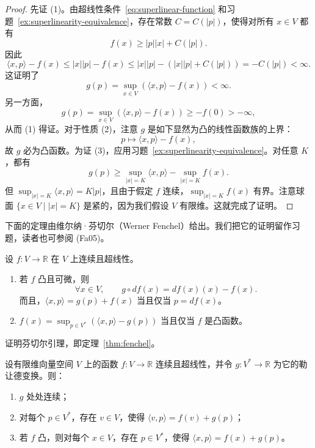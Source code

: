 \begin{proof}
先证 (1)。由超线性条件~\eqref{eq:superlinear-function} 和习题~\ref{ex:superlinearity-equivalence}，存在常数 $C=C(|p|)$，使得对所有 $x\in V$ 都有
\[
  f(x)\geq |p||x|+C(|p|).
\]
因此
\[
  \langle x,p\rangle-f(x)
  \leq |x||p|-f(x)
  \leq |x||p|-(|x||p|+C(|p|))
  =-C(|p|)<\infty.
\]
这证明了
\[
  g(p)=\sup_{x\in V}(\langle x,p\rangle-f(x))<\infty.
\]
另一方面，
\[
  g(p)=\sup_{x\in V}(\langle x,p\rangle-f(x))\geq-f(0)>-\infty,
\]
从而 (1) 得证。对于性质 (2)，注意 $g$ 是如下显然为凸的线性函数族的上界：
\[
  p\longmapsto\langle x,p\rangle-f(x),
\]
故 $g$ 必为凸函数。为证 (3)，应用习题~\ref{ex:superlinearity-equivalence}。对任意 $K$，都有
\[
  g(p)\geq\sup_{|x|=K}\langle x,p\rangle-\sup_{|x|=K}f(x).
\]
但 $\sup_{|x|=K}\langle x,p\rangle=K|p|$，且由于假定 $f$ 连续，$\sup_{|x|=K}f(x)$ 有界。注意球面 $\{x\in V\mid |x|=K\}$ 是紧的，因为我们假设 $V$ 有限维。这就完成了证明。
\end{proof}

下面的定理由维尔纳·芬切尔（Werner Fenchel）给出。我们把它的证明留作习题，读者也可参阅 (Fa05)。

\begin{theorem}[芬切尔]
\label{thm:fenchel}
设 $f:V\to\mathbb R$ 在 $V$ 上连续且超线性。
\begin{enumerate}[label=(\arabic*)]
  \item 若 $f$ 凸且可微，则
  \[
    \forall x\in V,\qquad g\circ df(x)=df(x)(x)-f(x).
  \]
  而且，$\langle x,p\rangle=g(p)+f(x)$ 当且仅当 $p=df(x)$。
  \item $f(x)=\sup_{p\in V^*}(\langle x,p\rangle-g(p))$ 当且仅当 $f$ 是凸函数。
\end{enumerate}
\end{theorem}

\begin{exercise}
\label{ex:prove-fenchel}
证明芬切尔引理，即定理~\ref{thm:fenchel}。
\end{exercise}

\begin{proposition}
\label{prop:legendre-extrema-exist}
设有限维向量空间 $V$ 上的函数 $f:V\to\mathbb R$ 连续且超线性，并令 $g:V^*\to\mathbb R$ 为它的勒让德变换。则：
\begin{enumerate}[label=(\arabic*)]
  \item $g$ 处处连续；
  \item 对每个 $p\in V^*$，存在 $v\in V$，使得 $\langle v,p\rangle=f(v)+g(p)$；
  \item 若 $f$ 凸，则对每个 $x\in V$，存在 $p\in V^*$，使得 $\langle x,p\rangle=f(x)+g(p)$。
\end{enumerate}
\end{proposition}


